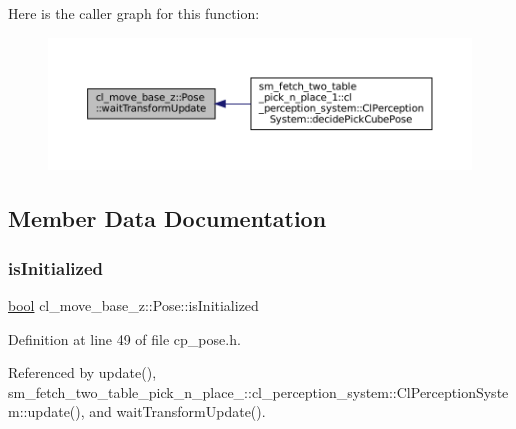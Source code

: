 Here is the caller graph for this function\+:
\nopagebreak
\begin{figure}[H]
\begin{center}
\leavevmode
\includegraphics[width=350pt]{classcl__move__base__z_1_1Pose_a5f8576c3dacfb2f2e7f9df5105c480ea_icgraph}
\end{center}
\end{figure}


\subsection{Member Data Documentation}
\mbox{\label{classcl__move__base__z_1_1Pose_a49df3a978021edb71a48ef5e6d8e75a8}} 
\subsubsection{\texorpdfstring{is\+Initialized}{isInitialized}}
{\footnotesize\ttfamily \hyperlink{classbool}{bool} cl\+\_\+move\+\_\+base\+\_\+z\+::\+Pose\+::is\+Initialized}



Definition at line 49 of file cp\+\_\+pose.\+h.



Referenced by update(), sm\+\_\+fetch\+\_\+two\+\_\+table\+\_\+pick\+\_\+n\+\_\+place\+\_\+::cl\+\_\+perception\+\_\+system\+::\+Cl\+Perception\+System\+::update(), and wait\+Transform\+Update().

\mbox{\label{classcl__move__base__z_1_1Pose_ae1b5ee53f49d74926e04a477d792f1d0}} 
